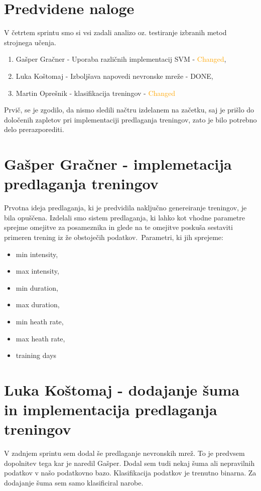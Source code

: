 \documentclass[a4paper,11pt]{article}
\begin{document}
\section{Predvidene naloge}
V četrtem sprintu smo si vsi zadali analizo oz. testiranje izbranih metod strojnega učenja.
	\begin{enumerate}
		\item{Gašper Gračner - Uporaba različnih implementacij SVM - \textcolor{Orange}{Changed}, }
		\item{Luka Koštomaj - Izboljšava napovedi nevronske mreže - \textcolor{OliveGreen}{DONE}, }
		\item{Martin Oprešnik - klasifikacija treningov - \textcolor{Orange}{Changed}}
	\end{enumerate}
Prvič, se je zgodilo, da nismo sledili načtru izdelanem na začetku, saj je prišlo do določenih zapletov pri implementaciji predlaganja treningov, zato je bilo potrebno delo prerazporediti.
	

\newpage
\section{Gašper Gračner - implemetacija predlaganja treningov}
Prvotna ideja predlaganja, ki je predvidila naključno genereiranje treningov, je bila opuščena. Izdelali smo sistem predlaganja, ki lahko kot vhodne parametre sprejme omejitve za posameznika in glede na te omejitve poskuša sestaviti primeren trening iz že obstoječih podatkov.\
Parametri, ki jih sprejeme:
\begin{itemize}
	\item{min intensity,}
	\item{max intensity,}
	\item{min duration,}
	\item{max duration,}
	\item{min heath rate,}
	\item{max heath rate,}
	\item{training days}
\end{itemize}

\section{Luka Koštomaj - dodajanje šuma in implementacija predlaganja treningov}
V zadnjem sprintu sem dodal še predlaganje nevronskih mrež. To je predvsem dopolnitev tega kar je naredil Gašper. Dodal sem tudi nekaj šuma ali nepravilnih podatkov v našo podatkovno bazo. Klasifikacija podatkov je trenutno binarna. Za dodajanje šuma sem samo klasificiral narobe.
\end{document}
